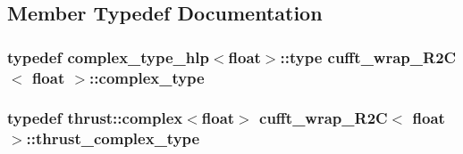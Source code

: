 \subsection{Member Typedef Documentation}
\hypertarget{classcufft__wrap__R2C_3_01float_01_4_a440b94a9e77e57995d6667008b1b4adc}{
\subsubsection[{complex\-\_\-type}]{\setlength{\rightskip}{0pt plus 5cm}typedef {\bf complex\-\_\-type\-\_\-hlp}$<$float$>$\-::type {\bf cufft\-\_\-wrap\-\_\-\-R2\-C}$<$ float $>$\-::{\bf complex\-\_\-type}}}\label{classcufft__wrap__R2C_3_01float_01_4_a440b94a9e77e57995d6667008b1b4adc}
\hypertarget{classcufft__wrap__R2C_3_01float_01_4_a6b4db0bf9b878d0d81cfbe7b84d1c5d3}{
\subsubsection[{thrust\-\_\-complex\-\_\-type}]{\setlength{\rightskip}{0pt plus 5cm}typedef {\bf thrust\-::complex}$<$float$>$ {\bf cufft\-\_\-wrap\-\_\-\-R2\-C}$<$ float $>$\-::{\bf thrust\-\_\-complex\-\_\-type}}}\label{classcufft__wrap__R2C_3_01float_01_4_a6b4db0bf9b878d0d81cfbe7b84d1c5d3}


